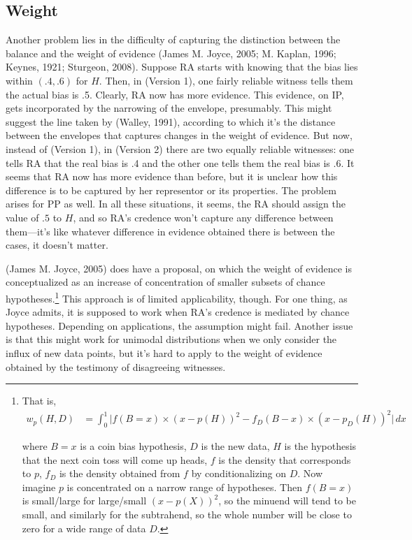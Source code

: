 \documentclass[
  10pt,
  dvipsnames,enabledeprecatedfontcommands]{scrartcl}
\begin{document}
\hypertarget{weight}{%
\subsection{Weight}\label{weight}}

Another problem lies in the difficulty of capturing the distinction
between the balance and the weight of evidence (James M. Joyce, 2005; M.
Kaplan, 1996; Keynes, 1921; Sturgeon, 2008). Suppose RA starts with
knowing that the bias lies within \((.4, .6)\) for \(H\). Then, in
(Version 1), one fairly reliable witness tells them the actual bias is
.5. Clearly, RA now has more evidence. This evidence, on IP, gets
incorporated by the narrowing of the envelope, presumably. This might
suggest the line taken by (Walley, 1991), according to which it's the
distance between the envelopes that captures changes in the weight of
evidence. But now, instead of (Version 1), in (Version 2) there are two
equally reliable witnesses: one tells RA that the real bias is .4 and
the other one tells them the real bias is .6. It seems that RA now has
more evidence than before, but it is unclear how this difference is to
be captured by her representor or its properties. The problem arises for
PP as well. In all these situations, it seems, the RA should assign the
value of \(.5\) to \(H\), and so RA's credence won't capture any
difference between them---it's like whatever difference in evidence
obtained there is between the cases, it doesn't matter.

(James M. Joyce, 2005) does have a proposal, on which the weight of
evidence is conceptualized as an increase of concentration of smaller
subsets of chance hypotheses.\footnote{That is, 
\begin{align*}
w_p (H,D) & = \int_{0}^{1} \vert 
f(B = x) \times (x - p(H))^2 - f_D(B - x) \times (x - p_{D}(H))^2
\vert \, dx
\end{align*}

\noindent where $B=x$ is a coin bias hypothesis, $D$ is the new data, $H$ is the hypothesis that the next coin toss will come up heads, $f$ is the density that corresponds to $p$, $f_D$ is the density obtained from $f$ by conditionalizing on $D$. Now imagine $p$ is concentrated on a narrow range of hypotheses. Then $f(B=x)$ is small/large for large/small $(x - p(X))^2$, so the minuend will  tend to be small, and similarly for the subtrahend, so the whole number will be close to zero for a wide range of data $D$.}
This approach is of limited applicability, though. For one thing, as
Joyce admits, it is supposed to work when RA's credence is mediated by
chance hypotheses. Depending on applications, the assumption might fail.
Another issue is that this might work for unimodal distributions when we
only consider the influx of new data points, but it's hard to apply to
the weight of evidence obtained by the testimony of disagreeing
witnesses.
\end{document}
